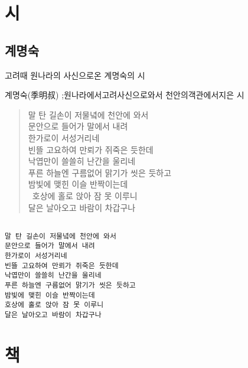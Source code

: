 \documentclass[12pt, a4paper, oneside]{book}
\let\stdsection\section
\renewcommand\section{\newpage\stdsection}
\begin{document}
	\chapter{ 시}


%										
	\section{ 계명숙 }

		고려때 원나라의 사신으로온 계명숙의 시

계명숙(季明叔) ;원나라에서고려사신으로와서 천안의객관에서지은 시

\begin{quote}

말 탄 길손이 저물녘에 천안에 와서 \\
문안으로 들어가 말에서 내려 \\
한가로이 서성거리네  \\
빈뜰 고요하여 만뢰가 쥐죽은 듯한데  \\
낙엽만이 쓸쓸히 난간을 울리네  \\
푸른 하늘엔 구름없어 맑기가 씻은 듯하고  \\
밤빛에 맺힌 이슬 반짝이는데  \\\
호상에 홀로 앉아 잠 못 이루니  \\
달은 날아오고 바람이 차갑구나  \\

\end{quote}


\begin{verbatim}

말 탄 길손이 저물녘에 천안에 와서 
문안으로 들어가 말에서 내려
한가로이 서성거리네
빈뜰 고요하여 만뢰가 쥐죽은 듯한데
낙엽만이 쓸쓸히 난간을 울리네
푸른 하늘엔 구름없어 맑기가 씻은 듯하고
밤빛에 맺힌 이슬 반짝이는데
호상에 홀로 앉아 잠 못 이루니
달은 날아오고 바람이 차갑구나

\end{verbatim}


%										
	\chapter{ 책}
\end{document}
